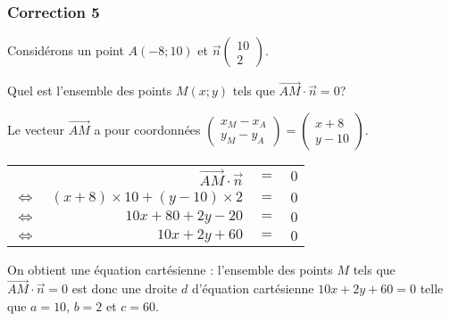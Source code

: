 \documentclass[15pt, mathserif]{beamer}
\newenvironment{Eq}{\begin{center}\begin{tabular}{rrcl}}{\end{tabular}\end{center}}
\newcommand{\ligneq}[2]{$\Longleftrightarrow$ & $#1$ & $=$ & $#2$ \\}
\newcommand{\Ligneq}[2]{ & $#1$ & $=$ & $#2$ \\}
\begin{document}
\begin{frame}
\vspace{-10mm}
	\frametitle{Correction 5}
\vspace{0.5cm} 
 Considérons un point $A(-8;10)$ et $\vec{n} \begin{pmatrix}
  10\\ 
 2 
 \end{pmatrix}$. 
 
 Quel est l'ensemble des points $M(x;y)$ tels que $\overrightarrow{AM} \cdot \vec{n}=0$?
 
 Le vecteur $\overrightarrow{AM}$ a pour coordonnées $\begin{pmatrix} 
 x_M-x_A \\ 
  y_M-y_A 
 \end{pmatrix}=\begin{pmatrix} x+8 \\ 
 y -10 
 \end{pmatrix}$. 
 
 \begin{Eq} 
 \Ligneq{\overrightarrow{AM} \cdot \vec{n}}{0} 
 \ligneq{(x+8) \times 10 + (y-10) \times2}{0} 
 \ligneq{10x+80+2y-20}{0} 
 \ligneq{10x+2y+60}{0} 
 \end{Eq} 
 
 On obtient une équation cartésienne : l'ensemble des points $M$ tels que $\overrightarrow{AM}\cdot \vec{n}=0$ est donc une droite $d$ d'équation cartésienne $10x+2y+60=0$ telle que $a=10$, $b=2$ et $c=60$. \end{frame}
\end{document}
